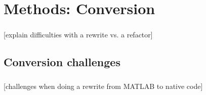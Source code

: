 \documentclass{beamer}
\newcommand{\tbackground}[1]{#1}
\newcommand{\tbackground}[1]{\textcolor{tbackground}{#1}}
\begin{document}

\section{Methods: Conversion}
\begin{frame}\frametitle{\secname}
	[\tbackground{explain difficulties with a rewrite vs. a refactor}]
\end{frame}

\subsection{Conversion challenges}
\begin{frame}\frametitle{\subsecname}
	[\tbackground{challenges when doing a rewrite from MATLAB to native code}]
\end{frame}
\end{document}
